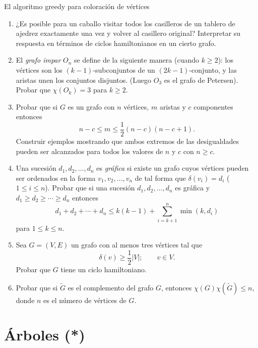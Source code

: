 \begin{section}{El algoritmo greedy para coloración de vértices}
\begin{enumerate}
\item ¿Es posible para un caballo visitar todos los casilleros de un
tablero de ajedrez exactamente una vez y volver al casillero
original? Interpretar su respuesta en términos de ciclos
hamiltonianos en un cierto grafo.

\item El \textit{grafo impar} $O_n$ se define de la siguiente
manera   (cuando $k\ge 2$): los vértices son
los $(k-1)$-subconjuntos de un $(2k-1)$-conjunto, y las aristas
unen los conjuntos disjuntos. (Luego $O_3$ es el grafo de
Petersen). Probar que $\chi(O_k)=3$ para $k\ge 2$.

\item Probar que si $G$ es un grafo con $n$ vértices, $m$ aristas y $c$
componentes entonces
$$
n-c \le m \le \frac12(n-c)(n-c+1).
$$
Construir ejemplos mostrando que ambos extremos de las
desigualdades pueden ser alcanzados para todos los valores de $n$
y $c$ con $n\ge c$.

\item Una sucesión $d_1,d_2,\ldots,d_n$ es \textit{gráfica} si existe un
grafo cuyos vértices pueden ser ordenados en la forma
$v_1,v_2,\ldots,v_n$ de tal forma que $\delta(v_i)=d_i$ ($1\le i
\le n$). Probar que si una sucesión $d_1,d_2,\ldots,d_n$ es
gráfica y $d_1 \ge d_2 \ge \cdots \ge d_n$ entonces
$$
d_1 + d_2 + \cdots + d_n \le k(k-1) + \sum_{i=k+1}^n
\operatorname{min}(k,d_i)
$$
para $1 \le k \le n$.

\item Sea $G=(V,E)$ un grafo con al menos tres vértices tal que
$$
\delta(v) \ge \frac12 |V|;\qquad v\in V.
$$
Probar que $G$ tiene un ciclo hamiltoniano.

\item Probar que si $\tilde G$ es el complemento del grafo $G$, entonces
$\chi(G)\chi(\tilde G)\le n$, donde $n$ es el número de vértices
de $G$.
\end{enumerate}
\end{section}


\chapter[Árboles]{Árboles (*)}\label{cap.arboles}

